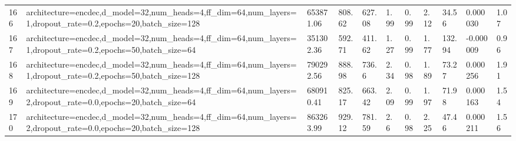 \begin{longtable}{C{0.8cm} L{2cm} C{1.15cm} C{1.15cm} C{1.15cm} C{1.15cm} C{0.85cm} C{1.25cm} C{1.2cm} C{1.5cm} C{1.0cm}}
166 & architecture=encdec,\newline d\_model=32,\newline num\_heads=4,\newline ff\_dim=64,\newline num\_layers=1,\newline dropout\_rate=0.2,\newline epochs=20,\newline batch\_size=128 & 653871.06 & 808.62 & 627.08 & 1.99 & 0.99 & 2.12 & 34.56 & 0.000030 & 1.07 \\
167 & architecture=encdec,\newline d\_model=32,\newline num\_heads=4,\newline ff\_dim=64,\newline num\_layers=1,\newline dropout\_rate=0.2,\newline epochs=50,\newline batch\_size=64 & 351302.36 & 592.71 & 411.62 & 1.27 & 0.99 & 1.77 & 132.94 & -0.000009 & 0.96 \\
168 & architecture=encdec,\newline d\_model=32,\newline num\_heads=4,\newline ff\_dim=64,\newline num\_layers=1,\newline dropout\_rate=0.2,\newline epochs=50,\newline batch\_size=128 & 790292.56 & 888.98 & 736.6 & 2.34 & 0.98 & 1.89 & 73.27 & 0.000256 & 1.91 \\
169 & architecture=encdec,\newline d\_model=32,\newline num\_heads=4,\newline ff\_dim=64,\newline num\_layers=2,\newline dropout\_rate=0.0,\newline epochs=20,\newline batch\_size=64 & 680910.41 & 825.17 & 663.42 & 2.09 & 0.99 & 1.97 & 71.98 & 0.000163 & 1.54 \\
170 & architecture=encdec,\newline d\_model=32,\newline num\_heads=4,\newline ff\_dim=64,\newline num\_layers=2,\newline dropout\_rate=0.0,\newline epochs=20,\newline batch\_size=128 & 863263.99 & 929.12 & 781.59 & 2.6 & 0.98 & 2.25 & 47.46 & 0.000211 & 1.56 \\

\end{longtable}
